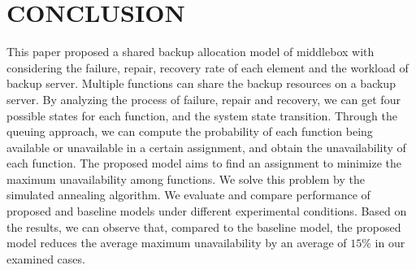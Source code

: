 \documentclass[conference]{IEEEtran}
\begin{document}

\section{CONCLUSION}
This paper proposed a shared backup allocation model of middlebox with considering the failure, repair, recovery rate of each element and the workload of backup server. Multiple functions can share the backup resources on a backup server. By analyzing the process of failure, repair and recovery, we can get four possible states for each function, and the system state transition. Through the queuing 
approach, we can compute the probability of each function being available or unavailable in a certain assignment, and obtain the unavailability of each function. The proposed model aims to find an assignment to minimize the maximum unavailability among functions. We solve this problem by the simulated annealing algorithm. We evaluate and compare performance of proposed and baseline models under different experimental conditions. Based on the results, we can observe that, compared to the baseline model, the proposed model reduces the average maximum unavailability by an average of $15\%$ in our examined cases.

\nocite{*}


\end{document}
